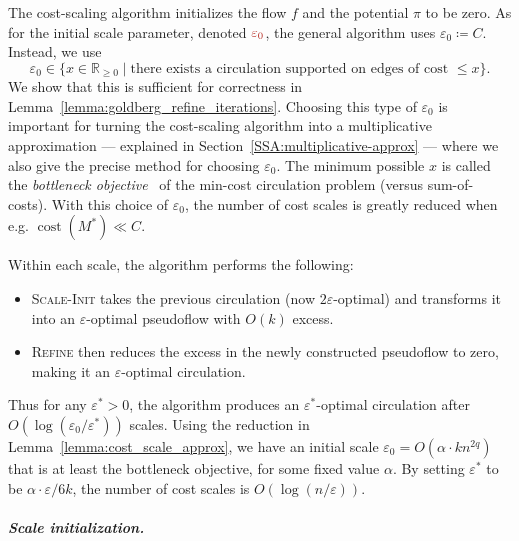 \documentclass[a4paper,UKenglish]{socg-lipics-v2018}
\def\eps{\varepsilon}
\def\reals{\mathbb{R}}
\def\cost{\operatorname{cost}}
\def\supp{\operatorname{supp}}
\theoremstyle{plain}
\numberwithin{figure}{section}
\renewcommand{\paragraph}{\subparagraph}
\def\EMPH#1{\textcolor{BrickRed}{{\emph{#1}}}}
\begin{document}
The cost-scaling algorithm initializes the flow $f$ and the potential $\pi$ to be zero.
As for the initial scale parameter, denoted $\EMPH{$\eps_0$}$,
the general algorithm \cite{GHKT17} uses $\eps_0 \coloneqq C$.
Instead, we use
\[
\eps_0 \in \{x \in \reals_{\geq 0} \mid \text{there exists a circulation supported on edges of cost $\leq x$}\}.
\]
We show that this is sufficient for correctness in Lemma~\ref{lemma:goldberg_refine_iterations}.
Choosing this type of $\eps_0$ is important for turning the cost-scaling
algorithm into a multiplicative approximation --- explained in
Section~\ref{SSA:multiplicative-approx} --- where we also give the precise
method for choosing $\eps_0$.
The minimum possible $x$ is called the \EMPH{bottleneck objective}~\cite{GT88}
of the min-cost circulation problem (versus sum-of-costs).
With this choice of $\eps_0$, the number of cost scales is greatly reduced when
e.g. $\cost(M^*) \ll C$.

Within each scale, the algorithm performs the following:
\begin{itemize}
\item \textsc{Scale-Init} takes the previous circulation (now $2\eps$-optimal)
and transforms it into an $\eps$-optimal pseudoflow with $O(k)$ excess.
\item \textsc{Refine} then reduces the excess in the newly constructed
pseudoflow to zero, making it an $\eps$-optimal circulation.
\end{itemize}
Thus for any $\eps^* > 0$, the algorithm produces an $\eps^*$-optimal circulation after
$O(\log(\eps_0/\eps^*))$ scales.
Using the reduction in Lemma~\ref{lemma:cost_scale_approx}, we have an initial
scale $\eps_0 = O(\alpha \cdot kn^{2q})$ that is at least the bottleneck
objective, for some fixed value $\alpha$.
By setting $\eps^*$ to be $\alpha \cdot \eps/6k$, the number of cost scales is
$O(\log(n/\eps))$.


\paragraph{Scale initialization.}

\end{document}
